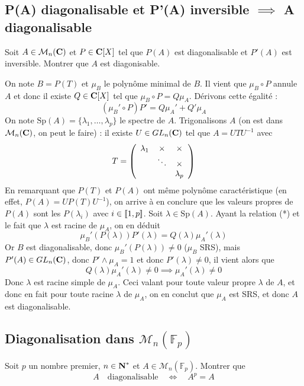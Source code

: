 \subsection{P(A) diagonalisable et P'(A) inversible $\implies$ A diagonalisable}
\begin{exercice}
Soit $A\in\mathcal M_n(\operatorname{\mathbf{C}})$ et $P\in\operatorname{\mathbf{C}}[X]$ tel que $P(A)$ est diagonalisable et $P'(A)$ est inversible. Montrer que $A$ est diagonisable.
\end{exercice}

\begin{correction}
	On note $B=P(T)$ et $\mu_B$ le polynôme minimal de $B$. Il vient que $\mu_B\circ P$ annule $A$ et donc il existe $Q\in\operatorname{\mathbf{C}}[X]$ tel que $\mu_B\circ P=Q\mu_A$. Dérivons cette égalité : \[(\mu_B'\circ P)P'=Q\mu_A'+Q'\mu_A\tag{*}\]
	On note $\text{Sp}(A)=\lbrace \lambda_1,\dots,\lambda_p\rbrace$ le spectre de $A$. Trigonalisons $A$ (on est dans $\mathcal M_n(\operatorname{\mathbf{C}})$, on peut le faire) : il existe $U\in GL_n(\operatorname{\mathbf{C}})$ tel que $A=UTU^{-1}$ avec 
	\[
		T = \left( \begin{array}{c c c} \lambda_1 & \times & \times\\ & \ddots & \times \\ & & \lambda_p\end{array} \right)
	\]
	En remarquant que $P(T)$ et $P(A)$ ont même polynôme caractéristique (en effet, $P(A)=UP(T)U^{-1}$), on arrive à en conclure que les valeurs propres de $P(A)$ sont les $P(\lambda_i)$ avec $i\in[\![1,p]\!]$. Soit $\lambda\in\text{Sp}(A)$. Ayant la relation (*) et le fait que $\lambda$ est racine de $\mu_A$, on en déduit \[\mu_B'(P(\lambda))P'(\lambda)=Q(\lambda)\mu_A'(\lambda)\]
	Or $B$ est diagonalisable, donc $\mu_B'(P(\lambda))\neq 0$ ($\mu_B$ SRS), mais $P'(A)\in GL_n(\operatorname{\mathbf{C}})$, donc $P'\wedge \mu_A=1$ et donc $P'(\lambda)\neq 0$, il vient alors que \[Q(\lambda)\mu_A'(\lambda)\neq 0 \implies \mu_A'(\lambda)\neq 0\]
	Donc $\lambda$ est racine simple de $\mu_A$. Ceci valant pour toute valeur propre $\lambda$ de $A$, et donc en fait pour toute racine $\lambda$ de $\mu_A$, on en conclut que $\mu_A$ est SRS, et donc $A$ est diagonalisable.
\end{correction}

\subsection{Diagonalisation dans $\mathcal M_n(\mathbb F_p)$}
\begin{exercice}
Soit $p$ un nombre premier, $n\in\operatorname{\mathbf{N}}^*$ et $A\in\mathcal M_n(\mathbb F_p)$. Montrer que \[A\quad \text{diagonalisable}\quad \iff\quad A^p=A\]
\end{exercice}


